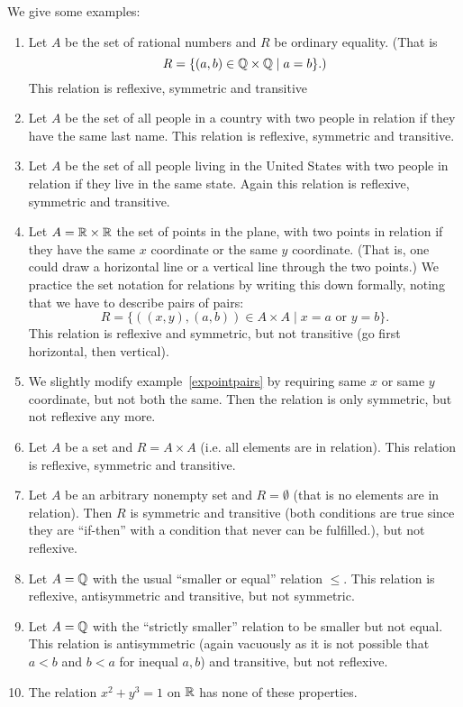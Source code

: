 We give some examples:
\begin{enumerate}
\item
Let $A$ be the set of rational numbers and $R$ be ordinary equality. (That is
\[
R=\{(a,b)\in{\mathbb Q}\times{\mathbb Q}\mid a=b\}.)
\]
This relation is reflexive, symmetric and transitive
\item
Let $A$ be the set of all people in a country with two people in relation if they have
the same last name. This relation is reflexive, symmetric and transitive.
\item
Let $A$ be the set of all people living in the United
States with two people in
relation if they live in the same state. Again this relation is reflexive, symmetric and
transitive.
\item
\label{expointpairs}
Let $A={\mathbb R}\times{\mathbb R}$ the set of points in the plane, with two points in relation
if they have the same $x$ coordinate or the same $y$ coordinate. (That is, one could
draw a horizontal line or a vertical line through the two points.)
We practice the set notation for relations by writing this down formally, noting that
we have to describe pairs of pairs:
\[
R=\{((x,y),(a,b))\in A\times A\mid x=a \mbox{\ or\ }y=b\}.
\]
This relation is reflexive and symmetric, but not transitive (go first horizontal, then
vertical).
\item
We slightly modify example~\ref{expointpairs} by requiring same $x$ or same $y$
coordinate, but not both the same. Then the relation is only symmetric, but not
reflexive any more.
\item
Let $A$ be a set and $R=A\times A$ (i.e. all elements are in relation). This relation
is reflexive, symmetric and transitive.
\item
Let $A$ be an arbitrary nonempty set and $R=\emptyset$ (that is no elements
are in relation). Then $R$ is symmetric and transitive (both conditions are
true since they are ``if-then'' with a condition that
never can be fulfilled.), but not reflexive.
\item Let $A={\mathbb Q}$ with the usual ``smaller or equal'' relation $\le$. This relation is
reflexive, antisymmetric and transitive, but not symmetric.
\item Let $A={\mathbb Q}$ with the ``strictly smaller'' relation to be smaller but not equal.
This relation is antisymmetric (again vacuously as it is not possible that $a<b$ and
$b<a$ for inequal $a,b$) and transitive, but not reflexive.
\item The relation $x^2+y^3=1$ on ${\mathbb R}$ has none of these properties.
\end{enumerate}


